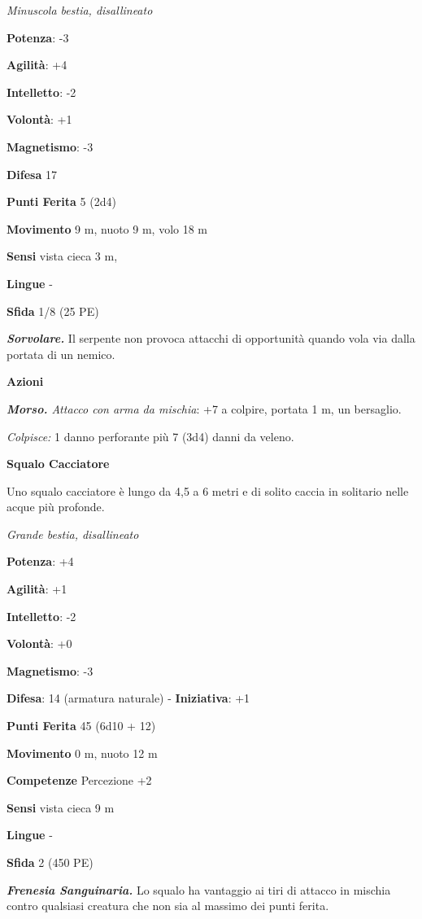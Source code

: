 \begin{multicols}{2}
\emph{Minuscola bestia, disallineato}

\textbf{Potenza}: -3

\textbf{Agilità}: +4

\textbf{Intelletto}: -2

\textbf{Volontà}: +1

\textbf{Magnetismo}: -3

\textbf{Difesa} 17

\textbf{Punti Ferita} 5 (2d4)

\textbf{Movimento} 9 m, nuoto 9 m, volo 18 m

\textbf{Sensi} vista cieca 3 m, 

\textbf{Lingue} -

\textbf{Sfida} 1/8 (25 PE)\smallskip

\emph{\textbf{Sorvolare.}} Il serpente non provoca attacchi di
opportunità quando vola via dalla portata di un nemico.

\smallskip\textbf{Azioni}

\emph{\textbf{Morso.} Attacco con arma da mischia}: +7 a colpire,
portata 1 m, un bersaglio.

\emph{Colpisce:} 1 danno perforante più 7 (3d4) danni da veleno.

\textbf{Squalo Cacciatore}

Uno squalo cacciatore è lungo da 4,5 a 6 metri e di solito caccia in
solitario nelle acque più profonde.

\emph{Grande bestia, disallineato}

\textbf{Potenza}: +4

\textbf{Agilità}: +1

\textbf{Intelletto}: -2

\textbf{Volontà}: +0

\textbf{Magnetismo}: -3

\textbf{Difesa}: 14 (armatura naturale) - \textbf{Iniziativa}: +1

\textbf{Punti Ferita} 45 (6d10 + 12)

\textbf{Movimento} 0 m, nuoto 12 m

\textbf{Competenze} Percezione +2

\textbf{Sensi} vista cieca 9 m

\textbf{Lingue} -

\textbf{Sfida} 2 (450 PE)\smallskip

\emph{\textbf{Frenesia Sanguinaria.}} Lo squalo ha vantaggio ai tiri di
attacco in mischia contro qualsiasi creatura che non sia al massimo dei
punti ferita.


\end{multicols}
